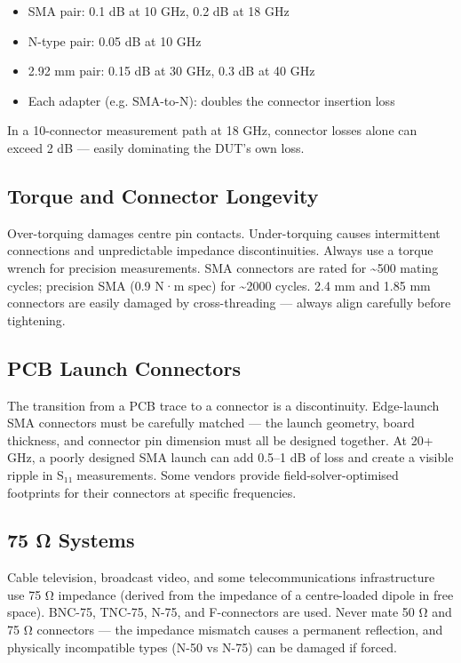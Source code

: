       
\begin{itemize}

        \item SMA pair: 0.1 dB at 10 GHz, 0.2 dB at 18 GHz

        \item N-type pair: 0.05 dB at 10 GHz

        \item 2.92 mm pair: 0.15 dB at 30 GHz, 0.3 dB at 40 GHz

        \item Each adapter (e.g. SMA-to-N): doubles the connector insertion loss

      
\end{itemize}

      

In a 10-connector measurement path at 18 GHz, connector losses alone can exceed 2 dB — easily dominating the DUT's own loss.

      

\subsection{Torque and Connector Longevity}

      

Over-torquing damages centre pin contacts. Under-torquing causes intermittent connections and unpredictable impedance discontinuities. Always use a torque wrench for precision measurements. SMA connectors are rated for \textasciitilde{}500 mating cycles; precision SMA (0.9 N·m spec) for \textasciitilde{}2000 cycles. 2.4 mm and 1.85 mm connectors are easily damaged by cross-threading — always align carefully before tightening.

      

\subsection{PCB Launch Connectors}

      

The transition from a PCB trace to a connector is a discontinuity. Edge-launch SMA connectors must be carefully matched — the launch geometry, board thickness, and connector pin dimension must all be designed together. At 20+ GHz, a poorly designed SMA launch can add 0.5–1 dB of loss and create a visible ripple in S₁₁ measurements. Some vendors provide field-solver-optimised footprints for their connectors at specific frequencies.

      

\subsection{75 Ω Systems}

      

Cable television, broadcast video, and some telecommunications infrastructure use 75 Ω impedance (derived from the impedance of a centre-loaded dipole in free space). BNC-75, TNC-75, N-75, and F-connectors are used. Never mate 50 Ω and 75 Ω connectors — the impedance mismatch causes a permanent reflection, and physically incompatible types (N-50 vs N-75) can be damaged if forced.



